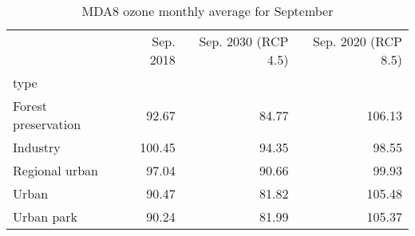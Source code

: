 \begin{table}
\centering
\caption{MDA8 ozone monthly average for September}
\label{o3_sep_type}
\begin{tabular}{lrrr}
\toprule
{} &  Sep. 2018 &  Sep. 2030 (RCP 4.5) &  Sep. 2020 (RCP 8.5) \\
type                &            &                      &                      \\
\midrule
Forest preservation &      92.67 &                84.77 &               106.13 \\
Industry            &     100.45 &                94.35 &                98.55 \\
Regional urban      &      97.04 &                90.66 &                99.93 \\
Urban               &      90.47 &                81.82 &               105.48 \\
Urban park          &      90.24 &                81.99 &               105.37 \\
\bottomrule
\end{tabular}
\end{table}

